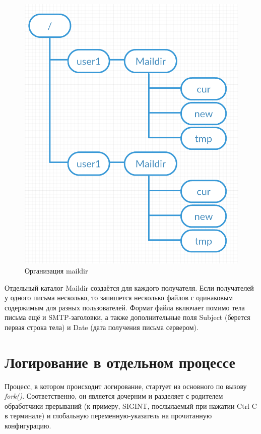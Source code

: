 \documentclass[a4paper,12pt]{report}
\begin{document}
\begin{figure}
\centering
\includegraphics[width=\textwidth]{diagramms/maildir.png}
\caption{Организация maildir}
\label{fig:maildir}
\end{figure}

Отдельный каталог Maildir создаётся для каждого получателя. Если получателей у одного письма несколько, то запишется несколько файлов с одинаковым содержимым для разных пользователей. Формат файла включает помимо тела письма ещё и SMTP-заголовки, а также дополнительные поля Subject (берется первая строка тела) и Date (дата получения письма сервером).


\section{Логирование в отдельном процессе}

Процесс, в котором происходит логирование, стартует из основного по вызову \textit{fork()}. Соответственно, он является дочерним и разделяет с родителем обработчики прерываний (к примеру, SIGINT, послылаемый при нажатии Ctrl-C в терминале) и глобальную переменную-указатель на прочитанную конфигурацию.
\end{document}
